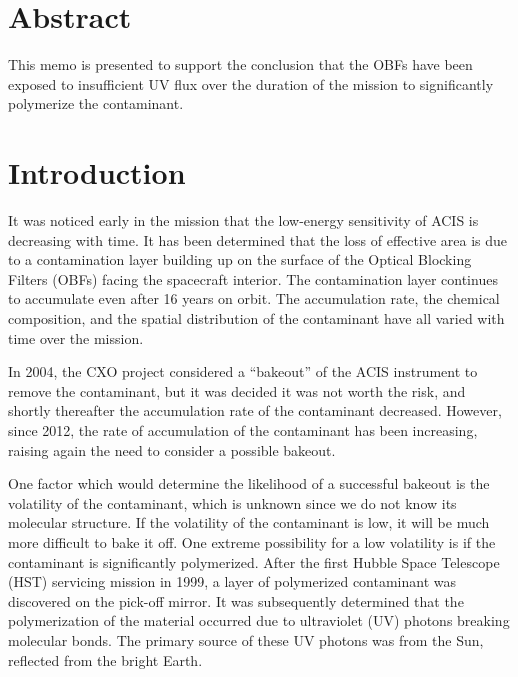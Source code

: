 \documentclass[11pt]{article}
\begin{document}


\Date{\today}


\memo{}

\section{Abstract}

This memo is presented to support the conclusion that the OBFs have been exposed
to insufficient UV flux over the duration of the mission to significantly polymerize
the contaminant.

\section{Introduction}

It was noticed early in the mission that the low-energy sensitivity of ACIS is
decreasing with time. It has been determined that the loss of effective area is
due to a contamination layer building up on the surface of the Optical Blocking
Filters (OBFs) facing the spacecraft interior. The contamination layer continues
to accumulate even after 16 years on orbit. The accumulation rate, the chemical
composition, and the spatial distribution of the contaminant have all varied with
time over the mission.

In 2004, the CXO project considered a ``bakeout'' of the ACIS instrument to remove
the contaminant, but it was decided it was not worth the risk, and shortly thereafter
the accumulation rate of the contaminant decreased. However, since 2012, the rate of
accumulation of the contaminant has been increasing, raising again the need to consider
a possible bakeout.

One factor which would determine the likelihood of a successful bakeout is the volatility
of the contaminant, which is unknown since we do not know its molecular structure. If the
volatility of the contaminant is low, it will be much more difficult to bake it off. One
extreme possibility for a low volatility is if the contaminant is significantly polymerized.
After the first Hubble Space Telescope (HST) servicing mission in 1999, a layer of polymerized
contaminant was discovered on the pick-off mirror. It was subsequently determined that
the polymerization of the material occurred due to ultraviolet (UV) photons breaking molecular
bonds. The primary source of these UV photons was from the Sun, reflected from the bright Earth.
\end{document}
